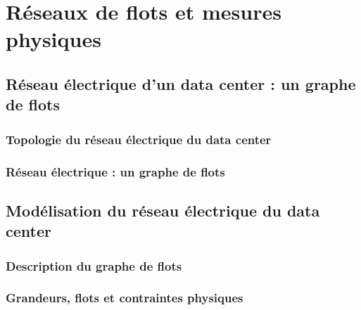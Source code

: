 
\chapter{R\'eseaux de flots et mesures physiques}
\label{ReseauFlotsMesures}
	

	\section{R\'eseau \'electrique d'un data center : un graphe de flots}
		\subsection{Topologie du r\'eseau \'electrique du data center}
			
		\subsection{R\'eseau \'electrique : un graphe de flots}
			
		
		
	\section{Mod\'elisation du r\'eseau \'electrique du data center}
		\subsection{Description du graphe de flots}
			
		\subsection{Grandeurs, flots et contraintes physiques}
			

